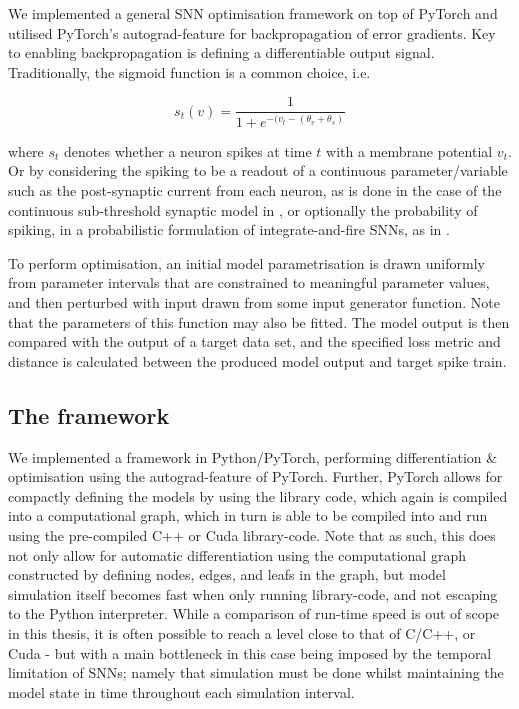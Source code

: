 \documentclass[mphil,deptreport,ianc]{infthesis} %
\begin{document}
We implemented a general SNN optimisation framework on top of PyTorch \cite{Paszke2017} and utilised PyTorch's autograd-feature for backpropagation of error gradients.
Key to enabling backpropagation is defining a differentiable output signal. Traditionally, the sigmoid function is a common choice, i.e.

\begin{equation}
    s_t(v) = \frac{1}{1+e^{-(v_t-(\theta_v + \theta_s)}}
\end{equation}

where $s_t$ denotes whether a neuron spikes at time $t$ with a membrane potential $v_t$. Or by considering the spiking to be a readout of a continuous parameter/variable such as the post-synaptic current from each neuron, as is done in the case of the continuous sub-threshold synaptic model in \cite{Huh2017}, or optionally the probability of spiking, in a probabilistic formulation of integrate-and-fire SNNs, as in \cite{Rene2020}.

To perform optimisation, an initial model parametrisation is drawn uniformly from parameter intervals that are constrained to meaningful parameter values, and then perturbed with input drawn from some input generator function. Note that the parameters of this function may also be fitted.
The model output is then compared with the output of a target data set, and the specified loss metric and distance is calculated between the produced model output and target spike train.

\subsection{The framework}

We implemented a framework in Python/PyTorch, performing differentiation \& optimisation using the autograd-feature of PyTorch.
Further, PyTorch allows for compactly defining the models by using the library code, which again is compiled into a computational graph, which in turn is able to be compiled into and run using the pre-compiled C++ or Cuda library-code.
Note that as such, this does not only allow for automatic differentiation using the computational graph constructed by defining nodes, edges, and leafs in the graph, but model simulation itself becomes fast when only running library-code, and not escaping to the Python interpreter.
While a comparison of run-time speed is out of scope in this thesis, it is often possible to reach a level close to that of C/C++, or Cuda - but with a main bottleneck in this case being imposed by the temporal limitation of SNNs; namely that simulation must be done whilst maintaining the model state in time throughout each simulation interval.
\end{document}
